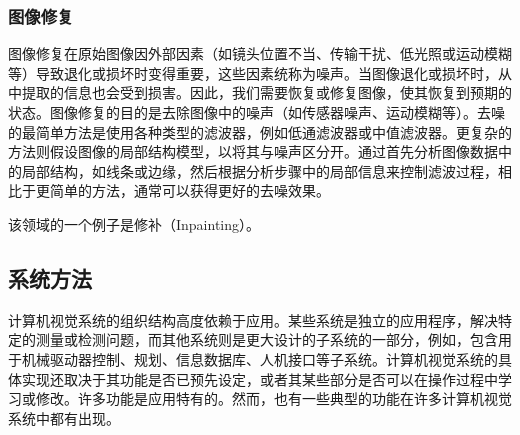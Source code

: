 \subsubsection{图像修复}  
图像修复在原始图像因外部因素（如镜头位置不当、传输干扰、低光照或运动模糊等）导致退化或损坏时变得重要，这些因素统称为噪声。当图像退化或损坏时，从中提取的信息也会受到损害。因此，我们需要恢复或修复图像，使其恢复到预期的状态。图像修复的目的是去除图像中的噪声（如传感器噪声、运动模糊等）。去噪的最简单方法是使用各种类型的滤波器，例如低通滤波器或中值滤波器。更复杂的方法则假设图像的局部结构模型，以将其与噪声区分开。通过首先分析图像数据中的局部结构，如线条或边缘，然后根据分析步骤中的局部信息来控制滤波过程，相比于更简单的方法，通常可以获得更好的去噪效果。

该领域的一个例子是修补（Inpainting）。
\subsection{系统方法}  
计算机视觉系统的组织结构高度依赖于应用。某些系统是独立的应用程序，解决特定的测量或检测问题，而其他系统则是更大设计的子系统的一部分，例如，包含用于机械驱动器控制、规划、信息数据库、人机接口等子系统。计算机视觉系统的具体实现还取决于其功能是否已预先设定，或者其某些部分是否可以在操作过程中学习或修改。许多功能是应用特有的。然而，也有一些典型的功能在许多计算机视觉系统中都有出现。

